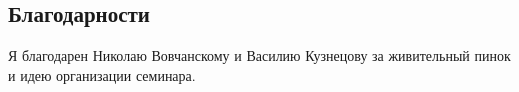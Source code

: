\documentclass[a0,portrait]{a0poster}
\begin{document}
\begin{multicols}{2}

\section*{Благодарности}

Я благодарен Николаю Вовчанскому и Василию Кузнецову за живительный пинок и идею организации семинара.


\end{multicols}
\end{document}
